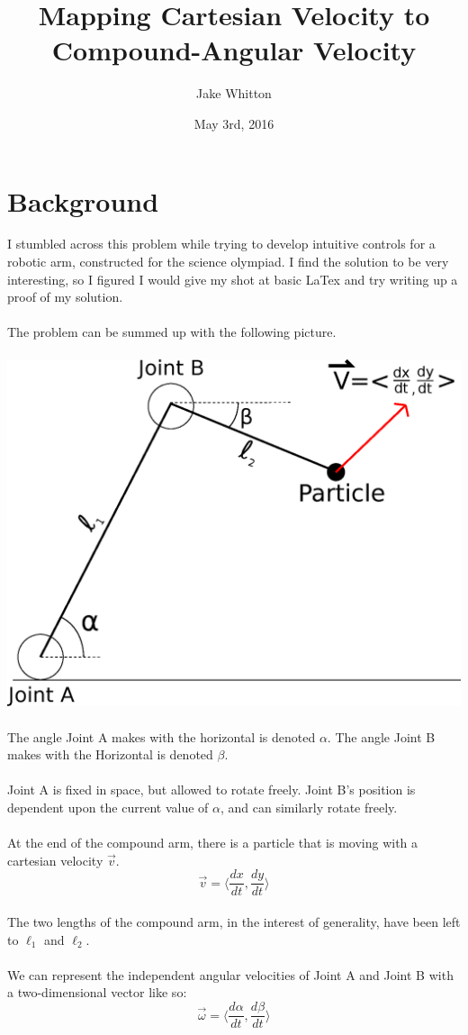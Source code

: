 \documentclass{article}
\title{Mapping Cartesian Velocity to Compound-Angular Velocity}
\author{Jake Whitton}
\date{May 3rd, 2016}
\begin{document}
\maketitle
\section{Background}
I stumbled across this problem while trying to develop intuitive controls for a robotic arm, constructed for the science olympiad.  I find the solution to be very interesting, so I figured I would give my shot at basic LaTex and try writing up a proof of my solution.
\\
\\
The problem can be summed up with the following picture.
\\
\\
\includegraphics[width=\textwidth]{drawing1.eps}
\\
\\
The angle Joint A makes with the horizontal is denoted $\alpha$.  The angle Joint B makes with the Horizontal is denoted $\beta$.
\\
\\
Joint A is fixed in space, but allowed to rotate freely.  Joint B's position is dependent upon the current value of $\alpha$, and can similarly rotate freely.
\\
\\
At the end of the compound arm, there is a particle that is moving with a cartesian velocity $\vec{v}$.
\begin{equation*}
\vec{v} = \langle\frac{dx}{dt}, \frac{dy}{dt}\rangle
\end{equation*}
\\
The two lengths of the compound arm, in the interest of generality, have been left to $\ell_1$ and $\ell_2$.
\\
\\
We can represent the independent angular velocities of Joint A and Joint B with a two-dimensional vector like so:
\begin{equation*}
\vec{\omega} = \langle \frac{d\alpha}{dt}, \frac{d\beta}{dt} \rangle
\end{equation*}
\end{document}
